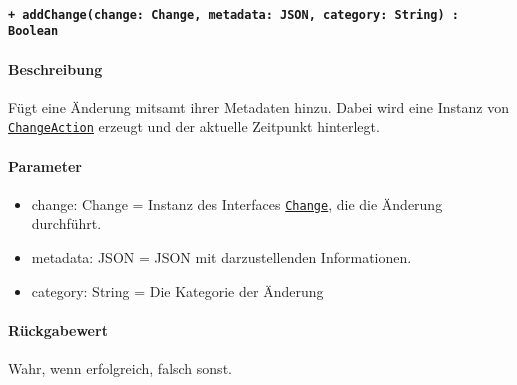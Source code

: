 \paragraph{\texttt{+ addChange(change: Change, metadata: JSON, category: String) : Boolean}}\label{AP_Changes_addChange}%
\paragraph*{Beschreibung}
Fügt eine Änderung mitsamt ihrer Metadaten hinzu.
Dabei wird eine Instanz von \hyperref[AP_ChangeAction]{\texttt{ChangeAction}} erzeugt und der aktuelle Zeitpunkt hinterlegt.
\paragraph*{Parameter}
\begin{itemize}
    \item change: Change = Instanz des Interfaces \hyperref[AP_Change]{\texttt{Change}}, die die Änderung durchführt.
    \item metadata: JSON = JSON mit darzustellenden Informationen.
    \item category: String = Die Kategorie der Änderung
\end{itemize}
\paragraph*{Rückgabewert}
Wahr, wenn erfolgreich, falsch sonst.
